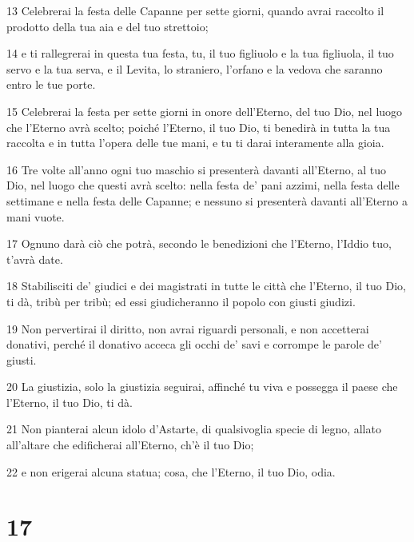 \par 13 Celebrerai la festa delle Capanne per sette giorni, quando avrai raccolto il prodotto della tua aia e del tuo strettoio;
\par 14 e ti rallegrerai in questa tua festa, tu, il tuo figliuolo e la tua figliuola, il tuo servo e la tua serva, e il Levita, lo straniero, l'orfano e la vedova che saranno entro le tue porte.
\par 15 Celebrerai la festa per sette giorni in onore dell'Eterno, del tuo Dio, nel luogo che l'Eterno avrà scelto; poiché l'Eterno, il tuo Dio, ti benedirà in tutta la tua raccolta e in tutta l'opera delle tue mani, e tu ti darai interamente alla gioia.
\par 16 Tre volte all'anno ogni tuo maschio si presenterà davanti all'Eterno, al tuo Dio, nel luogo che questi avrà scelto: nella festa de' pani azzimi, nella festa delle settimane e nella festa delle Capanne; e nessuno si presenterà davanti all'Eterno a mani vuote.
\par 17 Ognuno darà ciò che potrà, secondo le benedizioni che l'Eterno, l'Iddio tuo, t'avrà date.
\par 18 Stabilisciti de' giudici e dei magistrati in tutte le città che l'Eterno, il tuo Dio, ti dà, tribù per tribù; ed essi giudicheranno il popolo con giusti giudizi.
\par 19 Non pervertirai il diritto, non avrai riguardi personali, e non accetterai donativi, perché il donativo acceca gli occhi de' savi e corrompe le parole de' giusti.
\par 20 La giustizia, solo la giustizia seguirai, affinché tu viva e possegga il paese che l'Eterno, il tuo Dio, ti dà.
\par 21 Non pianterai alcun idolo d'Astarte, di qualsivoglia specie di legno, allato all'altare che edificherai all'Eterno, ch'è il tuo Dio;
\par 22 e non erigerai alcuna statua; cosa, che l'Eterno, il tuo Dio, odia.

\chapter{17}

